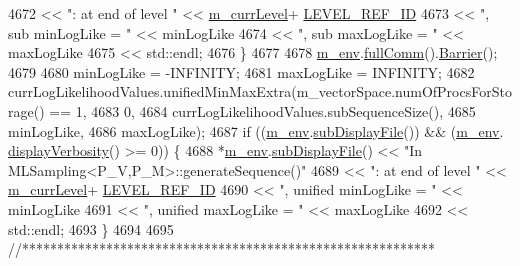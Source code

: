 \begin{DoxyCode}
{{4672                               << \textcolor{stringliteral}{": at end of level "}  << \hyperlink{class_q_u_e_s_o_1_1_m_l_sampling_af9416874c856e50f3b35270e801f17e4}{m\_currLevel}+
      \hyperlink{_m_l_sampling_level_options_8h_a68d15eaf394d210effcf584b938206d3}{LEVEL\_REF\_ID}
4673                               << \textcolor{stringliteral}{", sub minLogLike = "} << minLogLike
4674                               << \textcolor{stringliteral}{", sub maxLogLike = "} << maxLogLike
4675                               << std::endl;
4676     \}
4677 
4678     \hyperlink{class_q_u_e_s_o_1_1_m_l_sampling_a13f1ca4fe9f94822fe572a743eaced1d}{m\_env}.\hyperlink{class_q_u_e_s_o_1_1_base_environment_a0b0779b41ff304058856e97e1d16b4d4}{fullComm}().\hyperlink{class_q_u_e_s_o_1_1_mpi_comm_a4059971c30e023b272fccaa6aa00c426}{Barrier}();
4679 
4680     minLogLike = -INFINITY;
4681     maxLogLike =  INFINITY;
4682     currLogLikelihoodValues.unifiedMinMaxExtra(m\_vectorSpace.numOfProcsForStorage() == 1,
4683                                                0,
4684                                                currLogLikelihoodValues.subSequenceSize(),
4685                                                minLogLike,
4686                                                maxLogLike);
4687     \textcolor{keywordflow}{if} ((\hyperlink{class_q_u_e_s_o_1_1_m_l_sampling_a13f1ca4fe9f94822fe572a743eaced1d}{m\_env}.\hyperlink{class_q_u_e_s_o_1_1_base_environment_a8a0064746ae8dddfece4229b9ad374d6}{subDisplayFile}()) && (\hyperlink{class_q_u_e_s_o_1_1_m_l_sampling_a13f1ca4fe9f94822fe572a743eaced1d}{m\_env}.
      \hyperlink{class_q_u_e_s_o_1_1_base_environment_a1fe5f244fc0316a0ab3e37463f108b96}{displayVerbosity}() >= 0)) \{
4688       *\hyperlink{class_q_u_e_s_o_1_1_m_l_sampling_a13f1ca4fe9f94822fe572a743eaced1d}{m\_env}.\hyperlink{class_q_u_e_s_o_1_1_base_environment_a8a0064746ae8dddfece4229b9ad374d6}{subDisplayFile}() << \textcolor{stringliteral}{"In MLSampling<P\_V,P\_M>::generateSequence()"}
4689                               << \textcolor{stringliteral}{": at end of level "}      << \hyperlink{class_q_u_e_s_o_1_1_m_l_sampling_af9416874c856e50f3b35270e801f17e4}{m\_currLevel}+
      \hyperlink{_m_l_sampling_level_options_8h_a68d15eaf394d210effcf584b938206d3}{LEVEL\_REF\_ID}
4690                               << \textcolor{stringliteral}{", unified minLogLike = "} << minLogLike
4691                               << \textcolor{stringliteral}{", unified maxLogLike = "} << maxLogLike
4692                               << std::endl;
4693     \}
4694 
4695     \textcolor{comment}{//***********************************************************}
}}
\end{DoxyCode}
